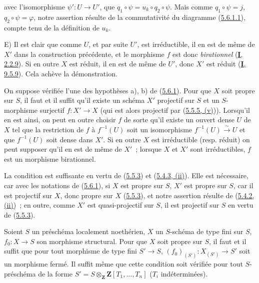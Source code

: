 
avec l'isomorphisme $\psi':U\to U'$, que
$q_1\circ\psi=u_k\circ q_2\circ\psi$. Mais comme $q_1\circ\psi=j$,
$q_2\circ\psi=\varphi$, notre assertion résulte de la commutativité du
diagramme (\hyperref[II.5.6.1.1-fr]{5.6.1.1}), compte tenu de la définition de
$u_k$.

E) Il est clair que comme $U$, et par suite $U'$, est irréductible, il en est
de même de $X'$ dans la construction précédente, et le morphisme $f$ est donc
\emph{birationnel} (\hyperref[I.2.2.9-fr]{\textbf{I}, 2.2.9}). Si en outre $X$ est réduit, il
en est de même de $U'$, donc $X'$ est réduit
(\hyperref[I.9.5.9-fr]{\textbf{I}, 9.5.9}). Cela achève la démonstration.

\begin{corollary}[5.6.2]
\label{II.5.6.2-fr}
On suppose vérifiée l'une des hypothèses \textup{a), b)} de
(\hyperref[II.5.6.1-fr]{5.6.1}). Pour que $X$ soit propre sur $S$, il faut et
il suffit qu'il existe un schéma $X'$ projectif sur $S$ et un $S$-morphisme
surjectif $f:X'\to X$ (qui est alors projectif par
(\hyperref[II.5.5.5-fr]{5.5.5, (v)})). Lorsqu'il en est ainsi, on peut en
outre choisir $f$ de sorte qu'il existe un ouvert dense $U$ de $X$ tel que la
restriction de $f$ à $f^{-1}(U)$ soit un isomorphisme
$f^{-1}(U)\xrightarrow{\sim}U$ et que $f^{-1}(U)$ soit dense dans $X'$. Si en outre $X$
est irréductible \textup{(resp.} réduit) on peut supposer qu'il en est de même de
$X'$~; lorsque $X$ et $X'$ sont irréductibles, $f$ est un morphisme
birationnel.
\end{corollary}

La condition est suffisante en vertu de (\hyperref[II.5.5.3-fr]{5.5.3}) et
(\hyperref[II.5.4.3-fr]{5.4.3, (ii)}). Elle est nécessaire, car avec les
notations de (\hyperref[II.5.6.1-fr]{5.6.1}), si $X$ est propre sur $S$, $X'$
est propre sur $S$, car il est projectif sur $X$, donc propre sur $X$
(\hyperref[II.5.5.3-fr]{5.5.3}), et notre assertion résulte de
(\hyperref[II.5.4.2-fr]{5.4.2, (ii)})~; en outre, comme $X'$ est
quasi-projectif sur $S$, il est projectif sur $S$ en vertu de
(\hyperref[II.5.5.3-fr]{5.5.3}).

\begin{corollary}[5.6.3]
\label{II.5.6.3-fr}
Soient $S$ un préschéma localement noethérien, $X$ un $S$-schéma de type fini
sur $S$, $f_0:X\to S$ son morphisme structural. Pour que $X$ soit propre sur
$S$, il faut et il suffit que pour tout morphisme \textup{de type fini} $S'\to S$,
$(f_0)_{(S')}:X_{(S')}\to S'$ soit un morphisme fermé. Il suffit même que
cette condition soit vérifiée pour tout $S$-préschéma de la forme
$S'=S\otimes_{\mathbf Z}\mathbf Z[T_1,\ldots,T_n]$ ($T_i$ indéterminées).
\end{corollary}

